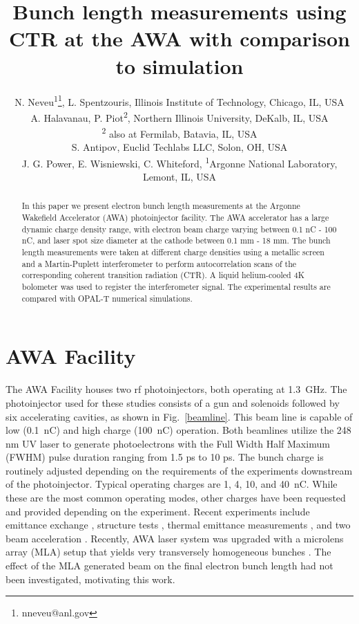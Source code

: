 \documentclass[letterpaper,  %
              ]{jacow-2_3}   %
\begin{document}
\title{Bunch length measurements using CTR at the AWA with comparison to simulation}

\author{N. Neveu\textsuperscript{1}\thanks{nneveu@anl.gov}, 
	    L. Spentzouris, Illinois Institute of Technology, Chicago, IL, USA \\
		A. Halavanau, P. Piot\textsuperscript{2}, Northern Illinois University, DeKalb, IL, USA \\
		\textsuperscript{2} also at Fermilab, Batavia, IL, USA \\
		S. Antipov, Euclid Techlabs LLC, Solon, OH, USA \\
	    J. G. Power, E. Wisniewski, C. Whiteford, \textsuperscript{1}Argonne National  Laboratory, Lemont, IL, USA \\
	    }
\maketitle

%
\begin{abstract}
In this paper we present electron bunch length measurements 
at the Argonne Wakefield Accelerator (AWA) photoinjector facility. 
The AWA accelerator has a large dynamic charge density range, 
with electron beam charge varying between 0.1 nC - 100 nC, 
and laser spot size diameter at the cathode between 0.1 mm - 18 mm. 
The bunch length measurements were taken at different charge densities 
using a metallic screen and a Martin-Puplett interferometer to perform 
autocorrelation scans of the corresponding coherent transition radiation (CTR). 
A liquid helium-cooled 4K bolometer was used to register the interferometer signal. 
The experimental results are compared with OPAL-T numerical simulations.
\end{abstract}


\section{AWA Facility}
The AWA Facility houses two rf photoinjectors, both 
operating at \SI{1.3}{GHz}. The photoinjector used for 
these studies consists of a gun and solenoids followed
by six accelerating cavities, as shown in Fig.~\ref{beamline}. 
This beam line is capable of low (\SI{0.1}{nC}) and 
high charge (\SI{100}{nC}) operation.
Both beamlines utilize the 248 nm UV laser 
to generate photoelectrons with the Full Width Half Maximum
(FWHM) pulse duration ranging from 1.5 ps to 10 ps.
The bunch charge is 
routinely adjusted depending on the requirements 
of the experiments downstream of the photoinjector.
Typical operating charges are 1, 4, 10, and \SI{40}{nC}. 
While these are the most
common operating modes, other charges have been requested 
and provided depending on the experiment.
Recent experiments include emittance exchange \cite{eex}, 
structure tests \cite{pets}, thermal emittance measurements \cite{therm}, 
and two beam acceleration \cite{tba}. 
Recently, AWA laser system was upgraded with a microlens array (MLA) setup
that yields very transversely homogeneous bunches \cite{PhysRevAccelBeams.20.103404}.
The effect of the MLA generated beam on the final electron 
bunch length had not been investigated, motivating this work.
\end{document}
